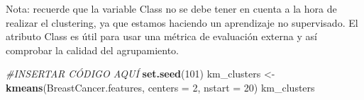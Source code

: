 \documentclass[]{article}
\newenvironment{Shaded}{\begin{snugshade}}{\end{snugshade}}
\newcommand{\CommentTok}[1]{\textcolor[rgb]{0.56,0.35,0.01}{\textit{#1}}}
\newcommand{\DataTypeTok}[1]{\textcolor[rgb]{0.13,0.29,0.53}{#1}}
\newcommand{\DecValTok}[1]{\textcolor[rgb]{0.00,0.00,0.81}{#1}}
\newcommand{\KeywordTok}[1]{\textcolor[rgb]{0.13,0.29,0.53}{\textbf{#1}}}
\newcommand{\NormalTok}[1]{#1}
\newcommand{\StringTok}[1]{\textcolor[rgb]{0.31,0.60,0.02}{#1}}
\begin{document}
Nota: recuerde que la variable Class no se debe tener en cuenta a la
hora de realizar el clustering, ya que estamos haciendo un aprendizaje
no supervisado. El atributo Class es útil para usar una métrica de
evaluación externa y así comprobar la calidad del agrupamiento.

\begin{Shaded}
\begin{Highlighting}[]
\CommentTok{#INSERTAR CÓDIGO AQUÍ}
\KeywordTok{set.seed}\NormalTok{(}\DecValTok{101}\NormalTok{)}
\NormalTok{km_clusters <-}\StringTok{ }\KeywordTok{kmeans}\NormalTok{(BreastCancer.features, }\DataTypeTok{centers =} \DecValTok{2}\NormalTok{, }\DataTypeTok{nstart =} \DecValTok{20}\NormalTok{)}
\NormalTok{km_clusters}
\end{Highlighting}
\end{Shaded}
\end{document}
